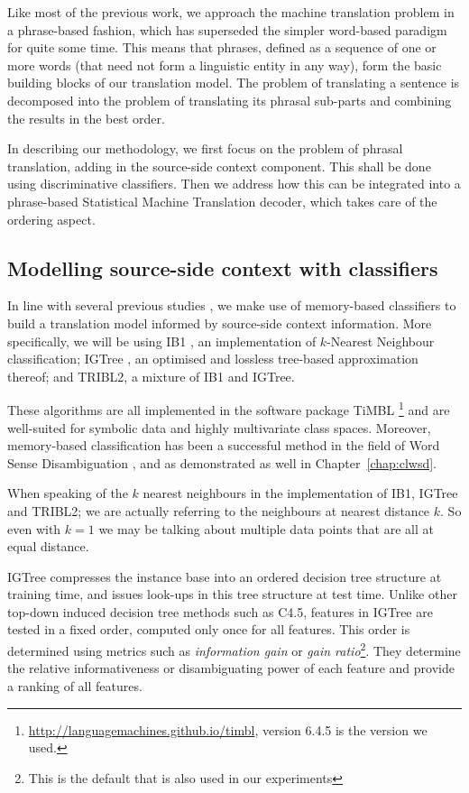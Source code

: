 Like most of the previous work, we approach the machine translation
problem in a phrase-based fashion, which has superseded the simpler word-based
paradigm for quite some time. This means that phrases, defined as a
sequence of one or more words (that need not form a linguistic entity in any
way), form the basic building blocks of our translation model. The problem of
translating a sentence is decomposed into the problem of translating its phrasal
sub-parts and combining the results in the best order.

In describing our methodology, we first focus on the problem of phrasal
translation, adding in the source-side context component. This shall be done
using discriminative classifiers. Then we address how this can be integrated into a
phrase-based Statistical Machine Translation decoder, which takes care of
the ordering aspect. 


\subsection{Modelling source-side context with classifiers}

In line with several previous studies \citep{Rejwanul+11,PBMBMT,
  Stroppa+07,MARKERBASED}, we make use of memory-based classifiers to
build a translation model informed by source-side context
information. More specifically, we will be using IB1 \citep{IB1}, an
implementation of $k$-Nearest Neighbour classification; IGTree
\citep{IGTree}, an optimised and lossless tree-based approximation
thereof; and TRIBL2, a mixture of IB1 and IGTree.

These algorithms are all implemented in the software package TiMBL
\citep{TIMBL}\footnote{\url{http://languagemachines.github.io/timbl}, version 6.4.5 is the
version we used.} and are well-suited for symbolic data and highly multivariate
class spaces.  Moreover, memory-based classification has been a successful
method in the field of Word Sense Disambiguation \citep{SENSEVAL2}, and as
demonstrated as well in Chapter~\ref{chap:clwsd}.

When speaking of the $k$ nearest neighbours in the implementation of IB1,
IGTree and TRIBL2; we are actually referring to the neighbours at nearest
distance $k$. So even with $k=1$ we may be talking about multiple data points
that are all at equal distance.

IGTree compresses the instance base into an ordered decision tree structure at
training time, and issues look-ups in this tree structure at test time. Unlike
other top-down induced decision tree methods such as C4.5, features in IGTree
are tested in a fixed order, computed only once for all features. This order is
determined using metrics such as \emph{information gain} or \emph{gain
ratio}\footnote{This is the default that is also used in our experiments}. They
determine the relative informativeness or disambiguating power of each feature
and provide a ranking of all features. 

